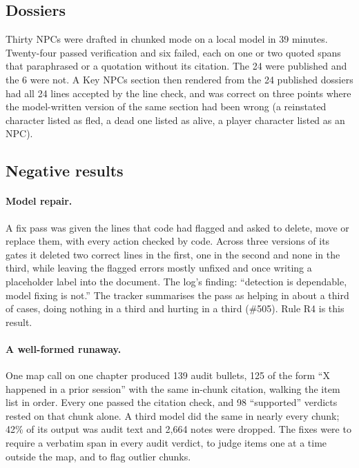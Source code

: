 \documentclass[11pt]{article}
\begin{document}
\subsection{Dossiers}

Thirty NPCs were drafted in chunked mode on a local model in 39 minutes. Twenty-four
passed verification and six failed, each on one or two quoted spans that paraphrased or
a quotation without its citation. The 24 were published and the 6 were not. A Key NPCs
section then rendered from the 24 published dossiers had all 24 lines accepted by the
line check, and was correct on three points where the model-written version of the same
section had been wrong (a reinstated character listed as fled, a dead one listed as
alive, a player character listed as an NPC).

\subsection{Negative results}
\label{sec:eval-neg}

\paragraph{Model repair.} A fix pass was given the lines that code had flagged and
asked to delete, move or replace them, with every action checked by code. Across three
versions of its gates it deleted two correct lines in the first, one in the second and
none in the third, while leaving the flagged errors mostly unfixed and once writing a
placeholder label into the document. The log's finding: ``detection is dependable, model
fixing is not.'' The tracker summarises the pass as helping in about a third of cases,
doing nothing in a third and hurting in a third (\#505). Rule R4 is this result.

\paragraph{A well-formed runaway.} One map call on one chapter produced 139 audit
bullets, 125 of the form ``X happened in a prior session'' with the same in-chunk
citation, walking the item list in order. Every one passed the citation check, and 98
``supported'' verdicts rested on that chunk alone. A third model did the same in nearly
every chunk; 42\% of its output was audit text and 2{,}664 notes were dropped. The fixes
were to require a verbatim span in every audit verdict, to judge items one at a time
outside the map, and to flag outlier chunks.
\end{document}
